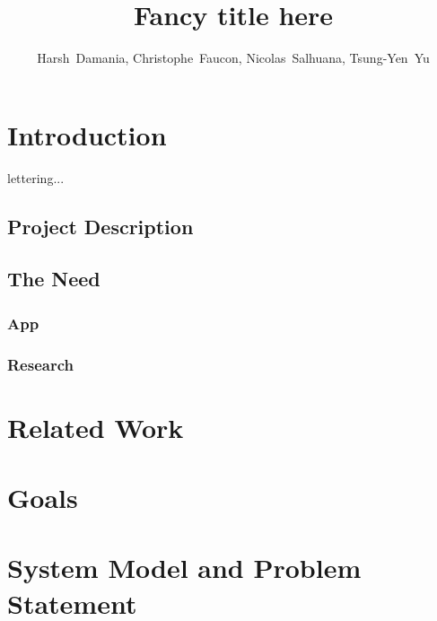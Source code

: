 \documentclass[11pt, journal]{IEEEtran}
\begin{document}
\title{Fancy title here}

\author{Harsh~Damania, Christophe~Faucon, Nicolas~Salhuana, Tsung-Yen~Yu}


\maketitle
\IEEEdisplaynotcompsoctitleabstractindextext

\section{Introduction}
	 lettering...

	\subsection{Project Description}
	
	\subsection{The Need}

		\subsubsection{App}

		\subsubsection{Research}

\section{Related Work}


\section{Goals}

\section{System Model and Problem Statement}

\end{document}
